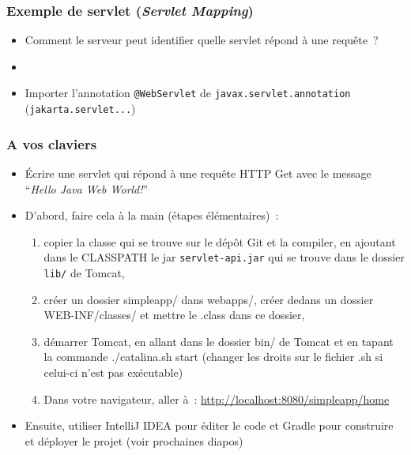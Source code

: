 \documentclass{beamer}
\begin{document}
\begin{frame}
  \frametitle{Exemple de servlet (\textit{Servlet Mapping})}
  \begin{itemize}
    \item Comment le serveur peut identifier quelle servlet répond à une
    requête~?  
    \item[]\vspace{4cm}
	\item Importer l'annotation \texttt{@WebServlet} de \texttt{javax.servlet.annotation} (\texttt{jakarta.servlet...})
  \end{itemize}
\end{frame}

\begin{frame}
  \frametitle{A vos claviers}

  \begin{itemize}
  \item Écrire une servlet qui répond à une requête HTTP Get avec le
    message ``\textit{Hello Java Web World!}''
    \item D'abord, faire cela à la main (étapes élémentaires)~:
    \begin{enumerate} 
    	\item copier la classe qui se trouve sur le dépôt Git et la compiler, en ajoutant dans le CLASSPATH le jar \texttt{servlet-api.jar} qui se trouve dans le dossier \texttt{lib/} de Tomcat,
    	\item  créer un dossier simpleapp/ dans webapps/, créer dedans un dossier WEB-INF/classes/ et mettre le .class dans ce dossier, 
    	\item démarrer Tomcat, en allant dans le dossier bin/ de Tomcat et en tapant la commande ./catalina.sh start (changer les droits sur le fichier .sh si celui-ci n'est pas exécutable)
    	\item Dans votre navigateur, aller à~: \url{http://localhost:8080/simpleapp/home}
    \end{enumerate}
  \item Ensuite, utiliser IntelliJ IDEA pour éditer le code et Gradle pour construire et déployer le projet (voir prochaines diapos)
  \end{itemize}
\end{frame}
\end{document}
